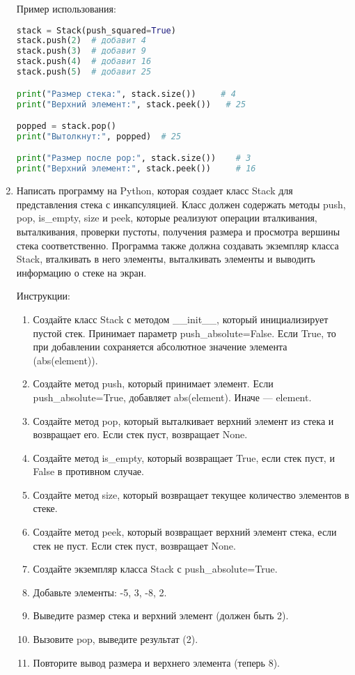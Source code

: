 \begin{enumerate}
Пример использования:
\begin{lstlisting}[language=Python]
stack = Stack(push_squared=True)
stack.push(2)  # добавит 4
stack.push(3)  # добавит 9
stack.push(4)  # добавит 16
stack.push(5)  # добавит 25

print("Размер стека:", stack.size())     # 4
print("Верхний элемент:", stack.peek())   # 25

popped = stack.pop()
print("Вытолкнут:", popped)  # 25

print("Размер после pop:", stack.size())    # 3
print("Верхний элемент:", stack.peek())     # 16
\end{lstlisting}

\item Написать программу на Python, которая создает класс Stack для представления стека с инкапсуляцией. Класс должен содержать методы push, pop, is\_empty, size и peek, которые реализуют операции вталкивания, выталкивания, проверки пустоты, получения размера и просмотра вершины стека соответственно. Программа также должна создавать экземпляр класса Stack, вталкивать в него элементы, выталкивать элементы и выводить информацию о стеке на экран.

Инструкции:
\begin{enumerate}
    \item Создайте класс Stack с методом \_\_init\_\_, который инициализирует пустой стек. Принимает параметр push\_absolute=False. Если True, то при добавлении сохраняется абсолютное значение элемента (abs(element)).
    \item Создайте метод push, который принимает элемент. Если push\_absolute=True, добавляет abs(element). Иначе — element.
    \item Создайте метод pop, который выталкивает верхний элемент из стека и возвращает его. Если стек пуст, возвращает None.
    \item Создайте метод is\_empty, который возвращает True, если стек пуст, и False в противном случае.
    \item Создайте метод size, который возвращает текущее количество элементов в стеке.
    \item Создайте метод peek, который возвращает верхний элемент стека, если стек не пуст. Если стек пуст, возвращает None.
    \item Создайте экземпляр класса Stack с push\_absolute=True.
    \item Добавьте элементы: -5, 3, -8, 2.
    \item Выведите размер стека и верхний элемент (должен быть 2).
    \item Вызовите pop, выведите результат (2).
    \item Повторите вывод размера и верхнего элемента (теперь 8).
\end{enumerate}


\end{enumerate}
